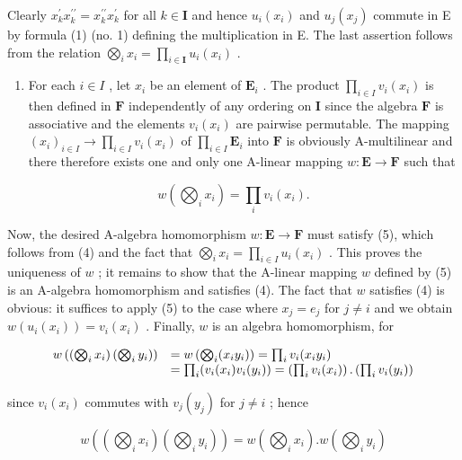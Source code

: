Clearly \(x_{k}^{\prime}x_{k}^{\prime \prime} = x_{k}^{\prime \prime}x_{k}^{\prime}\) for all \(k\in \mathbf{I}\) and hence \(u_{i}(x_{i})\) and \(u_{j}(x_{j})\) commute in E by formula (1) (no. 1) defining the multiplication in E. The last assertion follows from the relation \(\bigotimes_{i}x_{i} = \prod_{i\in \mathbf{I}}u_{i}(x_{i})\) .

\begin{enumerate}
\def\labelenumi{(\roman{enumi})}
\setcounter{enumi}{1}
\tightlist
\item
  For each \(i \in I\) , let \(x_{i}\) be an element of \(\mathbf{E}_{i}\) . The product \(\prod_{i \in I} v_{i}(x_{i})\) is then defined in \(\mathbf{F}\) independently of any ordering on \(\mathbf{I}\) since the algebra \(\mathbf{F}\) is associative and the elements \(v_{i}(x_{i})\) are pairwise permutable. The mapping \((x_{i})_{i \in I} \to \prod_{i \in I} v_{i}(x_{i})\) of \(\prod_{i \in I} \mathbf{E}_{i}\) into \(\mathbf{F}\) is obviously A-multilinear and there therefore exists one and only one A-linear mapping \(w: \mathbf{E} \to \mathbf{F}\) such that
\end{enumerate}

\[
w \left(\bigotimes_ {i} x _ {i}\right) = \prod_ {i} v _ {i} \left(x _ {i}\right).\tag{5}
\]

Now, the desired A-algebra homomorphism \(w: \mathbf{E} \to \mathbf{F}\) must satisfy (5), which follows from (4) and the fact that \(\bigotimes_{i} x_i = \prod_{i \in I} u_i(x_i)\) . This proves the uniqueness of \(w\) ; it remains to show that the A-linear mapping \(w\) defined by (5) is an A-algebra homomorphism and satisfies (4). The fact that \(w\) satisfies (4) is obvious: it suffices to apply (5) to the case where \(x_j = e_j\) for \(j \neq i\) and we obtain \(w(u_i(x_i)) = v_i(x_i)\) . Finally, \(w\) is an algebra homomorphism, for

\[
\begin{array}{r l} w \left(\left(\bigotimes_ {i} x _ {i}\right) \left(\bigotimes_ {i} y _ {i}\right)\right) & = w \left(\bigotimes_ {i} (x _ {i} y _ {i})\right) = \prod_ {i} v _ {i} (x _ {i} y _ {i}) \\ & = \prod_ {i} (v _ {i} (x _ {i}) v _ {i} (y _ {i})) = \left(\prod_ {i} v _ {i} (x _ {i})\right). \left(\prod_ {i} v _ {i} (y _ {i})\right) \end{array}
\]

since \(v_{i}(x_{i})\) commutes with \(v_{j}(y_{j})\) for \(j \neq i\) ; hence

\[
w \left(\left(\bigotimes_ {i} x _ {i}\right) \left(\bigotimes_ {i} y _ {i}\right)\right) = w \left(\bigotimes_ {i} x _ {i}\right). w \left(\bigotimes_ {i} y _ {i}\right)
\]

